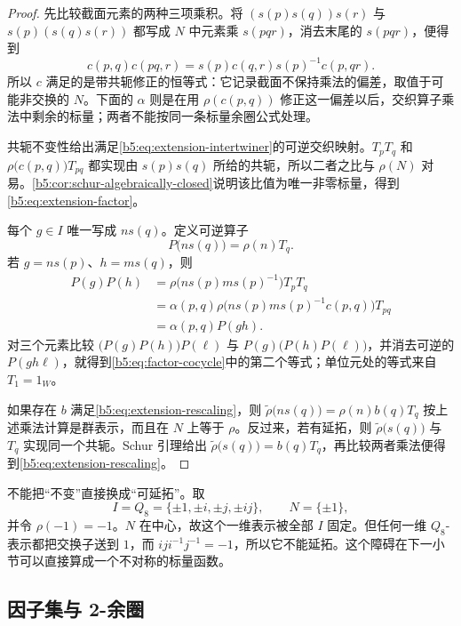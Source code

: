 \begin{proof}
	先比较截面元素的两种三项乘积。将 \((s(p)s(q))s(r)\) 与 \(s(p)(s(q)s(r))\) 都写成 \(N\) 中元素乘 \(s(pqr)\)，消去末尾的 \(s(pqr)\)，便得到
	\[
		c(p,q)c(pq,r) =s(p)c(q,r)s(p)^{-1}c(p,qr).
	\]
	所以 \(c\) 满足的是带共轭修正的恒等式：它记录截面不保持乘法的偏差，取值于可能非交换的 \(N\)。下面的 \(\alpha\) 则是在用 \(\rho(c(p,q))\) 修正这一偏差以后，交织算子乘法中剩余的标量；两者不能按同一条标量余圈公式处理。

	共轭不变性给出满足\eqref{b5:eq:extension-intertwiner}的可逆交织映射。\(T_pT_q\) 和 \(\rho\bigl(c(p,q)\bigr)T_{pq}\) 都实现由 \(s(p)s(q)\) 所给的共轭，所以二者之比与 \(\rho(N)\) 对易。\cref{b5:cor:schur-algebraically-closed}说明该比值为唯一非零标量，得到\eqref{b5:eq:extension-factor}。

	每个 \(g\in I\) 唯一写成 \(ns(q)\)。定义可逆算子
	\[
		P\bigl(ns(q)\bigr)=\rho(n)T_q.
	\]
	若 \(g=ns(p)\)、\(h=ms(q)\)，则
	\[
		\begin{aligned}
			P(g)P(h) &=\rho\bigl(n s(p)m s(p)^{-1}\bigr)T_pT_q\\
			&=\alpha(p,q) \rho\bigl(n s(p)m s(p)^{-1}c(p,q)\bigr)T_{pq}\\
			&=\alpha(p,q)P(gh).
		\end{aligned}
	\]
	对三个元素比较 \(\bigl(P(g)P(h)\bigr)P(\ell)\) 与 \(P(g)\bigl(P(h)P(\ell)\bigr)\)，并消去可逆的 \(P(gh\ell)\)，就得到\eqref{b5:eq:factor-cocycle}中的第二个等式；单位元处的等式来自 \(T_1=1_W\)。

	如果存在 \(b\) 满足\eqref{b5:eq:extension-rescaling}，则 \(\widetilde\rho\bigl(ns(q)\bigr)=\rho(n)b(q)T_q\) 按上述乘法计算是群表示，而且在 \(N\) 上等于 \(\rho\)。反过来，若有延拓，则 \(\widetilde\rho\bigl(s(q)\bigr)\) 与 \(T_q\) 实现同一个共轭。Schur 引理给出 \(\widetilde\rho\bigl(s(q)\bigr)=b(q)T_q\)，再比较两者乘法便得到\eqref{b5:eq:extension-rescaling}。
\end{proof}

不能把“不变”直接换成“可延拓”。取
\[
	I=Q_8=\{\pm1,\pm i,\pm j,\pm ij\},\qquad N=\{\pm1\},
\]
并令 \(\rho(-1)=-1\)。\(N\) 在中心，故这个一维表示被全部 \(I\) 固定。但任何一维 \(Q_8\)-表示都把交换子送到 \(1\)，而 \(iji^{-1}j^{-1}=-1\)，所以它不能延拓。这个障碍在下一小节可以直接算成一个不对称的标量函数。

\subsection{因子集与 2-余圈}
\label{b5:subsec:0404:02}

